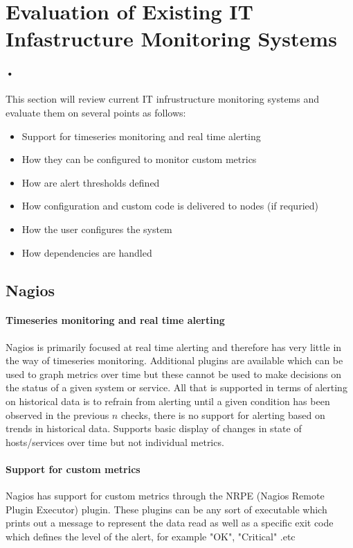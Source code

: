 \documentclass[10pt]{article}
\begin{document}
	\section{Evaluation of Existing IT Infastructure Monitoring Systems}
		\paragraph{•}
		This section will review current IT infrustructure monitoring systems and evaluate them on
		several points as follows:
		\begin{itemize}
			\item Support for timeseries monitoring and real time alerting
			\item How they can be configured to monitor custom metrics
			\item How are alert thresholds defined
			\item How configuration and custom code is delivered to nodes (if requried)
			\item How the user configures the system
			\item How dependencies are handled
		\end{itemize}
	
	\subsection{Nagios}
	\paragraph{Timeseries monitoring and real time alerting}
	Nagios is primarily focused at real time alerting and therefore has very little in the way of 
	timeseries monitoring.  Additional plugins are available which can be used to graph metrics
	over time but these cannot be used to make decisions on the status of a given system or service.
	All that is supported in terms of alerting on historical data is to refrain from alerting until
	a given condition has been observed in the previous $n$ checks, there is no support for alerting
	based on trends in historical data.  Supports basic display of changes in state of hosts/services
	over time but not individual metrics.
	
	\paragraph{Support for custom metrics}
	Nagios has support for custom metrics through the NRPE (Nagios Remote Plugin Executor) plugin.
	These plugins can be any sort of executable which prints out a message to represent the data read
	as well as a specific exit code which defines the level of the alert, for example "OK", "Critical"
	.etc
	
\end{document}
